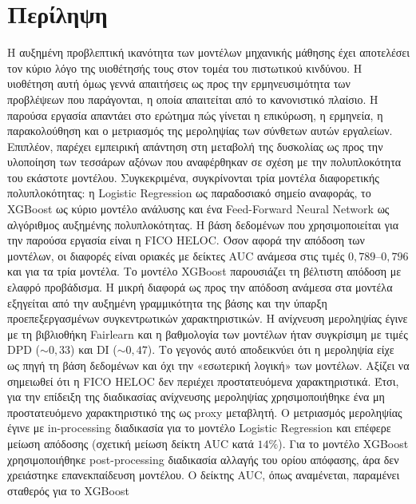 \chapter*{Περίληψη}

Η αυξημένη προβλεπτική ικανότητα των μοντέλων μηχανικής μάθησης έχει αποτελέσει
τον κύριο λόγο της υιοθέτησής τους στον τομέα του πιστωτικού κινδύνου. Η
υιοθέτηση αυτή όμως γεννά απαιτήσεις ως προς την ερμηνευσιμότητα των
προβλέψεων που παράγονται, η οποία απαιτείται από το κανονιστικό πλαίσιο. Η
παρούσα εργασία απαντάει στο ερώτημα πώς γίνεται η επικύρωση, η ερμηνεία, η
παρακολούθηση και ο μετριασμός της μεροληψίας των σύνθετων αυτών εργαλείων.
Επιπλέον, παρέχει εμπειρική απάντηση στη μεταβολή της δυσκολίας ως προς την
υλοποίηση των τεσσάρων αξόνων που αναφέρθηκαν σε σχέση με την πολυπλοκότητα
του εκάστοτε μοντέλου. Συγκεκριμένα, συγκρίνονται τρία μοντέλα διαφορετικής
πολυπλοκότητας: η Logistic Regression ως παραδοσιακό σημείο αναφοράς, το
XGBoost ως κύριο μοντέλο ανάλυσης και ένα Feed-Forward Neural Network ως
αλγόριθμος αυξημένης πολυπλοκότητας. Η βάση δεδομένων που χρησιμοποιείται
για την παρούσα εργασία είναι η FICO HELOC. Όσον αφορά την απόδοση των
μοντέλων, οι διαφορές είναι οριακές με δείκτες AUC ανάμεσα στις τιμές
$0{,}789$--$0{,}796$ και για τα τρία μοντέλα. Το μοντέλο XGBoost παρουσιάζει
τη βέλτιστη απόδοση με ελαφρό προβάδισμα. Η μικρή διαφορά ως προς την
απόδοση ανάμεσα στα μοντέλα εξηγείται από την αυξημένη γραμμικότητα της
βάσης και την ύπαρξη προεπεξεργασμένων συγκεντρωτικών χαρακτηριστικών. Η
ανίχνευση μεροληψίας έγινε με τη βιβλιοθήκη Fairlearn και η βαθμολογία των
μοντέλων ήταν συγκρίσιμη με τιμές DPD (${\sim}0{,}33$) και DI (${\sim}0{,}47$).
Το γεγονός αυτό αποδεικνύει ότι η μεροληψία είχε ως πηγή τη βάση δεδομένων
και όχι την «εσωτερική λογική» των μοντέλων. Αξίζει να σημειωθεί ότι η FICO
HELOC δεν περιέχει προστατευόμενα χαρακτηριστικά. Έτσι, για την επίδειξη της
διαδικασίας ανίχνευσης μεροληψίας χρησιμοποιήθηκε ένα μη προστατευόμενο
χαρακτηριστικό της ως proxy μεταβλητή. Ο μετριασμός μεροληψίας έγινε με in-processing διαδικασία
για το μοντέλο Logistic Regression και επέφερε μείωση απόδοσης (σχετική μείωση
δείκτη AUC κατά $14\%$). Για το μοντέλο XGBoost χρησιμοποιήθηκε post-processing
διαδικασία αλλαγής του ορίου απόφασης, άρα δεν χρειάστηκε επανεκπαίδευση
μοντέλου. Ο δείκτης AUC, όπως αναμένεται, παραμένει σταθερός για το XGBoost
